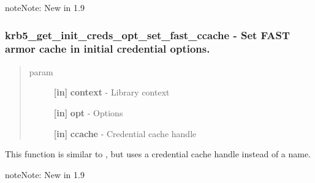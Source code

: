 \documentclass[letterpaper,10pt,english]{sphinxmanual}
\begin{document}
\begin{notice}{note}{Note:}
New in 1.9
\end{notice}


\subsubsection{krb5\_get\_init\_creds\_opt\_set\_fast\_ccache -  Set FAST armor cache in initial credential options.}
\label{appdev/refs/api/krb5_get_init_creds_opt_set_fast_ccache::doc}\label{appdev/refs/api/krb5_get_init_creds_opt_set_fast_ccache:krb5-get-init-creds-opt-set-fast-ccache-set-fast-armor-cache-in-initial-credential-options}

\begin{fulllineitems}
\label{appdev/refs/api/krb5_get_init_creds_opt_set_fast_ccache:krb5_get_init_creds_opt_set_fast_ccache}
\end{fulllineitems}

\begin{quote}\begin{description}
\item[{param}] \leavevmode
\textbf{{[}in{]}} \textbf{context} - Library context

\textbf{{[}in{]}} \textbf{opt} - Options

\textbf{{[}in{]}} \textbf{ccache} - Credential cache handle

\end{description}\end{quote}

This function is similar to {\hyperref[appdev/refs/api/krb5_get_init_creds_opt_set_fast_ccache_name:krb5_get_init_creds_opt_set_fast_ccache_name]{}} , but uses a credential cache handle instead of a name.

\begin{notice}{note}{Note:}
New in 1.9
\end{notice}
\end{document}
